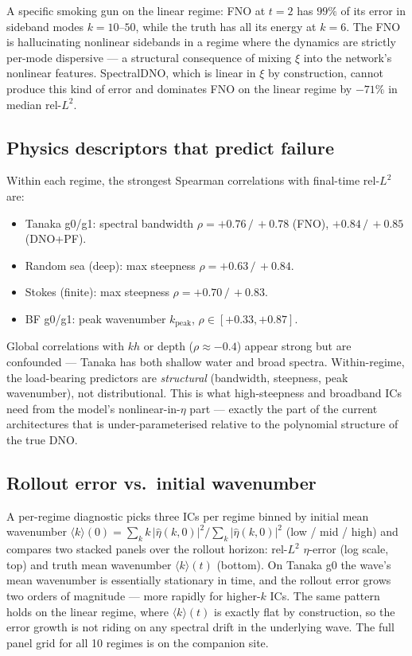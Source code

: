 \documentclass[11pt,letterpaper]{article}
\begin{document}
A specific smoking gun on the linear regime: FNO at $t=2$ has $99\%$ of
its error in sideband modes $k=10$--$50$, while the truth has all its
energy at $k=6$. The FNO is hallucinating nonlinear sidebands in a
regime where the dynamics are strictly per-mode dispersive --- a
structural consequence of mixing $\xi$ into the network's nonlinear
features. SpectralDNO, which is linear in $\xi$ by construction, cannot
produce this kind of error and dominates FNO on the linear regime by
$-71\%$ in median rel-$L^{2}$.

\subsection{Physics descriptors that predict failure}

Within each regime, the strongest Spearman correlations with final-time
rel-$L^{2}$ are:
\begin{itemize}[leftmargin=1.3em,itemsep=2pt]
  \item Tanaka g0/g1: spectral bandwidth $\rho = +0.76\,/\,+0.78$ (FNO),
        $+0.84\,/\,+0.85$ (DNO+PF).
  \item Random sea (deep): max steepness $\rho = +0.63\,/\,+0.84$.
  \item Stokes (finite): max steepness $\rho = +0.70\,/\,+0.83$.
  \item BF g0/g1: peak wavenumber $k_{\mathrm{peak}}$,
        $\rho \in [+0.33, +0.87]$.
\end{itemize}
Global correlations with $kh$ or depth ($\rho \approx -0.4$) appear strong
but are confounded --- Tanaka has both shallow water and broad spectra.
Within-regime, the load-bearing predictors are \emph{structural}
(bandwidth, steepness, peak wavenumber), not distributional. This is what
high-steepness and broadband ICs need from the model's
nonlinear-in-$\eta$ part --- exactly the part of the current architectures
that is under-parameterised relative to the polynomial structure of the
true DNO.

\subsection{Rollout error vs.\ initial wavenumber}

A per-regime diagnostic picks three ICs per regime binned by initial
mean wavenumber $\langle k\rangle(0) = \sum_k k\,|\hat\eta(k,0)|^{2}/\sum_k
|\hat\eta(k,0)|^{2}$ (low / mid / high) and compares two stacked panels
over the rollout horizon: rel-$L^{2}$ $\eta$-error (log scale, top)
and truth mean wavenumber $\langle k\rangle(t)$ (bottom). On Tanaka g0
the wave's mean wavenumber is essentially stationary in time, and the
rollout error grows two orders of magnitude --- more rapidly for
higher-$k$ ICs. The same pattern holds on the linear regime, where
$\langle k\rangle(t)$ is exactly flat by construction, so the error
growth is not riding on any spectral drift in the underlying wave.
The full panel grid for all 10 regimes is on the companion site.
\end{document}
